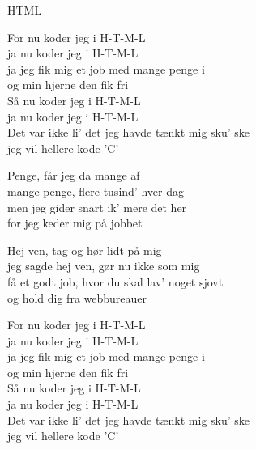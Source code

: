 \begin{song}{HTML}
  \begin{SBChorus}
    For nu koder jeg i H-T-M-L\\
    ja nu koder jeg i H-T-M-L\\
    ja jeg fik mig et job med mange penge i\\
    og min hjerne den fik fri\\\medskip
    Så nu koder jeg i H-T-M-L\\
    ja nu koder jeg i H-T-M-L\\
    Det var ikke li' det jeg havde tænkt mig sku' ske\\
    jeg vil hellere kode 'C'
  \end{SBChorus}


  \begin{SBVerse}
    Penge, får jeg da mange af\\
    mange penge, flere tusind' hver dag\\
    men jeg gider snart ik' mere det her\\
    for jeg keder mig på jobbet
  \end{SBVerse}

  \begin{SBVerse}
    Hej ven, tag og hør lidt på mig\\
    jeg sagde hej ven, gør nu ikke som mig\\
    få et godt job, hvor du skal lav' noget sjovt\\
    og hold dig fra webbureauer
  \end{SBVerse}

  \begin{SBChorus}
    For nu koder jeg i H-T-M-L\\
    ja nu koder jeg i H-T-M-L\\
    ja jeg fik mig et job med mange penge i\\
    og min hjerne den fik fri\\\medskip
    Så nu koder jeg i H-T-M-L\\
    ja nu koder jeg i H-T-M-L\\
    Det var ikke li' det jeg havde tænkt mig sku' ske\\
    jeg vil hellere kode 'C'
  \end{SBChorus}

\end{song}